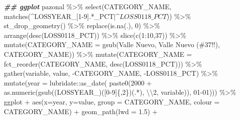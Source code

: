 \documentclass[10pt,landscape,a3paper]{article}
\newenvironment{Shaded}{\begin{snugshade}}{\end{snugshade}}
\newcommand{\AttributeTok}[1]{\textcolor[rgb]{0.77,0.63,0.00}{#1}}
\newcommand{\DecValTok}[1]{\textcolor[rgb]{0.00,0.00,0.81}{#1}}
\newcommand{\DocumentationTok}[1]{\textcolor[rgb]{0.56,0.35,0.01}{\textbf{\textit{#1}}}}
\newcommand{\FloatTok}[1]{\textcolor[rgb]{0.00,0.00,0.81}{#1}}
\newcommand{\FunctionTok}[1]{\textcolor[rgb]{0.00,0.00,0.00}{#1}}
\newcommand{\NormalTok}[1]{#1}
\newcommand{\SpecialCharTok}[1]{\textcolor[rgb]{0.00,0.00,0.00}{#1}}
\newcommand{\StringTok}[1]{\textcolor[rgb]{0.31,0.60,0.02}{#1}}
\begin{document}
\begin{Shaded}
\begin{Highlighting}[]
\DocumentationTok{\#\# ggplot}
\NormalTok{pazonal }\SpecialCharTok{\%\textgreater{}\%} \FunctionTok{select}\NormalTok{(CATEGORY\_NAME, }\FunctionTok{matches}\NormalTok{(}\StringTok{\textquotesingle{}\^{}LOSSYEAR\_[1{-}9].*\_PCT$|\^{}LOSS0118\_PCT$\textquotesingle{}}\NormalTok{)) }\SpecialCharTok{\%\textgreater{}\%}
  \FunctionTok{st\_drop\_geometry}\NormalTok{() }\SpecialCharTok{\%\textgreater{}\%} 
  \FunctionTok{replace}\NormalTok{(}\FunctionTok{is.na}\NormalTok{(.), }\DecValTok{0}\NormalTok{) }\SpecialCharTok{\%\textgreater{}\%}
  \FunctionTok{arrange}\NormalTok{(}\FunctionTok{desc}\NormalTok{(LOSS0118\_PCT)) }\SpecialCharTok{\%\textgreater{}\%} 
  \FunctionTok{slice}\NormalTok{(}\FunctionTok{c}\NormalTok{(}\DecValTok{1}\SpecialCharTok{:}\DecValTok{10}\NormalTok{,}\DecValTok{37}\NormalTok{)) }\SpecialCharTok{\%\textgreater{}\%} 
  \FunctionTok{mutate}\NormalTok{(}\AttributeTok{CATEGORY\_NAME =} \FunctionTok{gsub}\NormalTok{(}\StringTok{\textquotesingle{}Valle Nuevo\textquotesingle{}}\NormalTok{, }\StringTok{\textquotesingle{}Valle Nuevo (\#37!!)\textquotesingle{}}\NormalTok{, CATEGORY\_NAME)) }\SpecialCharTok{\%\textgreater{}\%} 
  \FunctionTok{mutate}\NormalTok{(}\AttributeTok{CATEGORY\_NAME =} \FunctionTok{fct\_reorder}\NormalTok{(CATEGORY\_NAME, }\FunctionTok{desc}\NormalTok{(LOSS0118\_PCT))) }\SpecialCharTok{\%\textgreater{}\%} 
  \FunctionTok{gather}\NormalTok{(variable, value, }\SpecialCharTok{{-}}\NormalTok{CATEGORY\_NAME, }\SpecialCharTok{{-}}\NormalTok{LOSS0118\_PCT) }\SpecialCharTok{\%\textgreater{}\%}
  \FunctionTok{mutate}\NormalTok{(}\AttributeTok{year =}\NormalTok{ lubridate}\SpecialCharTok{::}\FunctionTok{as\_date}\NormalTok{(}
    \FunctionTok{paste0}\NormalTok{(}\DecValTok{2000} \SpecialCharTok{+} \FunctionTok{as.numeric}\NormalTok{(}\FunctionTok{gsub}\NormalTok{(}\StringTok{\textquotesingle{}(LOSSYEAR\_)([0{-}9]\{,2\})(.*)\textquotesingle{}}\NormalTok{, }\StringTok{\textquotesingle{}}\SpecialCharTok{\textbackslash{}\textbackslash{}}\StringTok{2\textquotesingle{}}\NormalTok{, variable)), }\StringTok{\textquotesingle{}{-}01{-}01\textquotesingle{}}\NormalTok{))) }\SpecialCharTok{\%\textgreater{}\%} 
\NormalTok{  ggplot }\SpecialCharTok{+} \FunctionTok{aes}\NormalTok{(}\AttributeTok{x=}\NormalTok{year, }\AttributeTok{y=}\NormalTok{value, }\AttributeTok{group =}\NormalTok{ CATEGORY\_NAME, }\AttributeTok{colour =}\NormalTok{ CATEGORY\_NAME) }\SpecialCharTok{+} 
  \FunctionTok{geom\_path}\NormalTok{(}\AttributeTok{lwd =} \FloatTok{1.5}\NormalTok{) }\SpecialCharTok{+} 

\end{Highlighting}
\end{Shaded}
\end{document}
